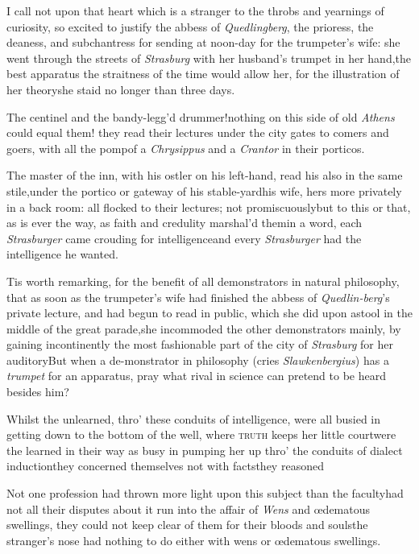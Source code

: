 \documentclass{article}
\begin{document}
I call not upon that heart which is a stranger to the throbs and
yearnings of curiosity, so excited to justify the abbess of
\textit{Quedlingberg}, the prioress, the deaness, and subchantress
for sending at noon-day for the trumpeter’s wife: she went
through the streets of \textit{Strasburg} with her husband’s
trumpet in her hand,\tsk the best apparatus the straitness
of the time would allow her, for the illustration of her theory\tsk she staid no longer than
three days.

The centinel and the bandy-legg’d\break
drummer!\tsh nothing on this side of old \textit{Athens}
could equal them! they read their lectures under the city gates to
comers and goers, with all the pomp\pb of a \textit{Chrysippus} and a
\textit{Crantor} in their porticos.

The master of the inn, with his ostler on his left-hand, read
his also in the same stile,\tsk under the portico or gateway of
his stable-yard\tsk his wife, hers more privately in a back room:
all flocked to their lectures; not promiscuously\tsk but to this
or that, as is ever the way, as faith and credulity marshal’d
them\tsk in a word, each \textit{Strasburger} came crouding
for intelligence\tsk and every \textit{Strasburger} had the
intelligence he wanted.

Tis worth remarking, for the benefit of all demonstrators
in natural philosophy, \etc that as soon as the
trumpeter’s wife had finished the abbess of
\textit{Quedlin-berg}’s private lecture, and had begun to read
in public, which she did upon a\pb stool in the middle of the great
parade,\tsh she incommoded the other demonstrators
mainly, by gaining incontinently the most fashionable part of the
city of \textit{Strasburg} for her auditory\tsk But when a
de-\break monstrator in philosophy (cries \textit{Slawken\-bergius}) has a
\textit{trumpet} for an apparatus, pray what rival in science can
pretend to be heard besides him?

Whilst the unlearned, thro’ these conduits of
intelligence, were all busied in getting down to the bottom of the
well, where \textsc{truth} keeps her little
court\tsh were the learned in their way as busy in pumping
her up thro’ the conduits of dialect
induction\tsk they concerned themselves not with
facts\tsk they reasoned\tsk

Not one profession had thrown more light upon this subject than
the faculty\tsk\pb had not all their disputes about it run into the
affair of \textit{Wens} and œdematous swellings, they could not
keep clear of them for their bloods and souls\tsh the
stranger’s nose had nothing to do either with wens or
œdematous swellings.
\end{document}
